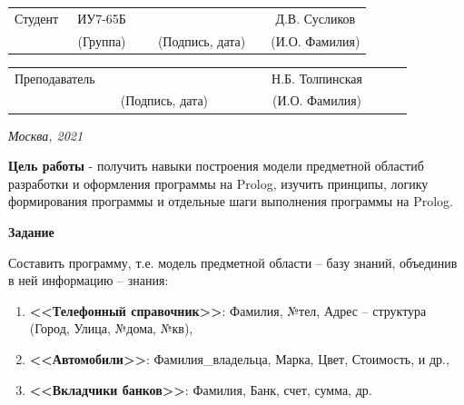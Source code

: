 \documentclass[12pt, a4paper]{extarticle}
\begin{document}
\noindent
{}
\\

\noindent
{}
\\

\vspace{1.5cm}
\noindent
\begin{tabular}{l c c c c c}
	Студент      & ~ИУ7-65Б~               & \hspace{2.5cm} & \hspace{2cm}                 & &  Д.В. Сусликов \\\cline{2-2}\cline{4-4} \cline{6-6} 
	\hspace{3cm} & {\footnotesize(Группа)} &                & {\footnotesize(Подпись, дата)} & & {\footnotesize(И.О. Фамилия)}
\end{tabular}

\noindent
\begin{tabular}{l c c c c}
	Преподаватель & \hspace{5cm}   & \hspace{2cm}                 & & ~~~~~~Н.Б. Толпинская~~~~~~\\\cline{3-3} \cline{5-5} 
	\hspace{3cm}  &                & {\footnotesize(Подпись, дата)} & & {\footnotesize(И.О. Фамилия)}
\end{tabular}

\vspace{0.6cm}
\begin{center}	
	\vfill
	\large \textit {Москва, 2021}
\end{center}

\thispagestyle {empty}
\pagebreak

\clearpage


\textbf{Цель работы} - получить навыки построения модели предметной областиб разработки и оформления программы на Prolog, изучить принципы, логику формирования программы и отдельные шаги выполнения программы на Prolog.

\textbf{Задание}

Составить программу, т.е. модель предметной области – базу знаний, объединив в ней информацию – знания:

\begin{enumerate}
	\item \textbf{<<Телефонный справочник>>}: Фамилия, №тел, Адрес – структура (Город, Улица, №дома, №кв),
	\item \textbf{<<Автомобили>>}: Фамилия\_владельца, Марка, Цвет, Стоимость, и др.,
	\item \textbf{<<Вкладчики банков>>}: Фамилия, Банк, счет, сумма, др.
\end{enumerate}
\end{document}
